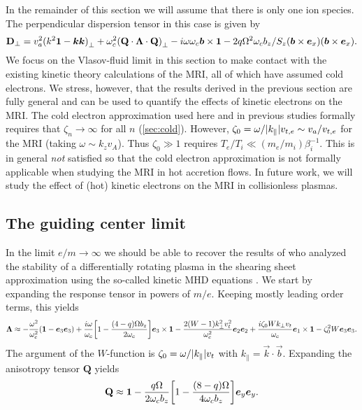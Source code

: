 \documentclass[aps,pre,notitlepage,amsmath,amssymb,amsfonts,nobibnotes,nofootinbib]{revtex4-1}
\begin{document}
In the remainder of this section we will assume that there is only one ion
species. The perpendicular dispersion tensor in this case is given by
\begin{equation}
  \label{eq:perpendicular-dispersion-single}
  \mathbf{D}_\perp =
  \va^2{(k^2\mathbf{1} - \vec{k}\vec{k})}_\perp
  + \omc^2{(\mathbf{Q}\cdot\mathbf{\Lambda}\cdot\mathbf{Q})}_\perp
  - i\omega\omc\vec{b}\times\mathbf{1}
  - 2q\Omega^2\omc b_z/S_z
  (\vec{b}\times\ex)(\vec{b}\times\ex).
\end{equation}
We focus on the Vlasov-fluid limit in this section to make contact with the
existing kinetic theory calculations of the MRI, all of which have assumed
cold electrons. We stress, however, that the results derived in the previous
section are fully general and can be used to quantify the effects of kinetic
electrons on the MRI\@. The cold electron approximation used here and in
previous studies formally requires that $\zeta_n\rightarrow\infty$ for all $n$
(\cref{sec:cold}). However,
$\zeta_0=\omega/|k_\parallel|v_{t,e}\sim{}v_a/v_{t,e}$ for the MRI (taking
$\omega\sim{}k_z{}v_A$). Thus $\zeta_0\gg{}1$ requires
$T_e/T_i\ll(m_e/m_i)\beta_i^{-1}$. This is in general \emph{not} satisfied so
that the cold electron approximation is not formally applicable when studying
the MRI in hot accretion flows. In future work, we will study the effect of
(hot) kinetic electrons on the MRI in collisionless plasmas.

\subsection{The guiding center limit}
\label{sec:guiding-center}

In the limit $e/m\to\infty$ we should be able to recover the results of
\citet{Quataert2002} who analyzed the stability of a differentially rotating
plasma in the shearing sheet approximation using the so-called kinetic MHD
equations \citep{Grad1961,Kulsrud1983,Hazeltine2004}. We start by expanding
the response tensor in powers of $m/e$. Keeping mostly leading order terms,
this yields
\begin{equation}
  \mathbf{\Lambda} \approx
  -\frac{\omega^2}{\omc^2}(\mathbf{1} - \vec{e}_3\vec{e}_3)
  + \frac{i\omega}{\omc}\left[1 - \frac{(4-q)\Omega b_z}{2\omc}\right]
  \vec{e}_3\times\mathbf{1}
  - \frac{2(W-1)k_\perp^2\vt^2}{\omc^2}\vec{e}_2\vec{e}_2
  + \frac{i\zeta_0 Wk_\perp\vt}{\omc}\vec{e}_1\times\mathbf{1}
  - \zeta_0^2 W\vec{e}_3\vec{e}_3.
\end{equation}
The argument of the $W$-function is $\zeta_0=\omega/|k_\parallel|v_t$ with
$k_\parallel=\vec{k}\cdot\vec{b}$. Expanding the anisotropy tensor
$\mathbf{Q}$ yields
\begin{equation}
  \mathbf{Q} \approx \mathbf{1} - \frac{q\Omega}{2\omc b_z}
  \left[1 - \frac{(8-q)\Omega}{4\omc b_z}\right]\ey\ey.
\end{equation}
\end{document}
